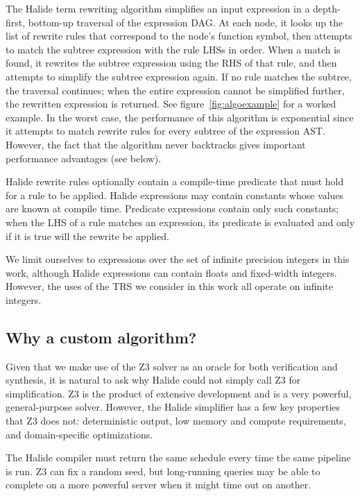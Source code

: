 \documentclass[sigplan,10pt,review,anonymous]{acmart}\settopmatter{printfolios=true,printccs=false,printacmref=false}
\begin{document}
The Halide term rewriting algorithm simplifies an input expression in a
depth-first, bottom-up traversal of the expression DAG. At each node, it looks
up the list of rewrite rules that correspond to the node's function symbol, then
attempts to match the subtree expression with the rule LHSs in order. When a
match is found, it rewrites the subtree expression using the RHS of that rule,
and then attempts to simplify the subtree expression again. If no rule matches
the subtree, the traversal continues; when the entire expression cannot be
simplified further, the rewritten expression is returned. See figure~\ref{fig:algoexample} for a worked example. 
In the worst case, the performance of this algorithm is exponential since it attempts to match rewrite rules for every subtree of the expression AST. However, the fact that the algorithm never backtracks gives important performance advantages (see below).

Halide rewrite rules optionally contain a compile-time predicate that must hold for a rule to
be applied. Halide expressions may contain constants whose values are known at
compile time. Predicate expressions contain only such constants; when the
LHS of a rule matches an expression, its predicate is evaluated and only if it
is true will the rewrite be applied.

We limit ourselves to expressions over the set of infinite precision integers in
this work, although Halide expressions can contain floats and fixed-width
integers. However, the uses of the TRS we consider in this work all operate
on infinite integers.

\subsection{Why a custom algorithm?}

Given that we make use of the Z3 solver as an oracle for both verification and synthesis, it is natural to ask why Halide could not simply call Z3 for simplification. Z3 is the product of extensive development and is a very powerful, general-purpose solver. However, the Halide simplifier has a few key properties that Z3 does not: deterministic output, low memory and compute requirements, and domain-specific optimizations.

The Halide compiler must return the same schedule every time the same pipeline is run. Z3 can fix a random seed, but long-running queries may be able to complete on a more powerful server when it might time out on another.
\end{document}
